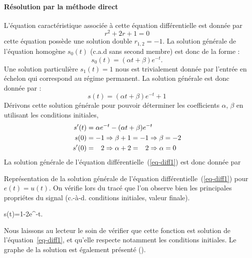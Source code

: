 \paragraph{Résolution par la méthode direct}
L'équation caractéristique associée à cette équation différentielle est 
donnée par 
\[
    r^2+2r+1=0
\]
cette équation possède une solution double $r_{1,2}=-1$.
La solution générale de l'équation homogène $s_0(t)$ (c.a.d sans second membre) 
est donc de la forme :
\[
    s_0(t)=(\alpha t+\beta)e^{-t}.
\]
Une solution particulière $s_1(t)=1$ nous est trivialement donnée par l'entrée 
en échelon qui correspond au régime permanent.
La solution générale est donc donnée par :
\[
    s(t)=(\alpha t+\beta)e^{-t}+1
\]
Dérivons cette solution générale pour pouvoir déterminer les coefficients 
$\alpha$, $\beta$ en utilisant les conditions initiales,
\begin{align*}
    s'(t)&=\alpha e^{-t}-(\alpha t+\beta)e^{-t}\\
     s(0)&=-1\Rightarrow\beta+1=-1\Rightarrow\beta=-2 \\
    s'(0)&=\hphantom{-}2\Rightarrow\alpha+2=\hphantom{-}2\Rightarrow\alpha=0
\end{align*}
La solution générale de l'équation différentielle~(\ref{eq-diff1}) est 
donc donnée par 
\begin{marginfigure}
    \centering
    \resizebox{\linewidth}{!}{}
    \caption{Représentation de la solution générale de l'équation 
             différentielle~(\ref{eq-diff1}) pour $e(t)=u(t)$. 
             On vérifie lors du tracé que l'on observe bien les principales 
             propriétes du signal (c.-à-d. conditions initiales, 
             valeur finale).\label{fig-solution}}
\end{marginfigure}
\begin{bequation}
s(t)=1-2e^{-t}.
\end{bequation}
Nous laissons au lecteur le soin de vérifier que cette fonction est solution 
de l'équation~\ref{eq-diff1}, et qu'elle respecte notamment les conditions 
initiales. Le graphe de la solution est également présenté 
().
